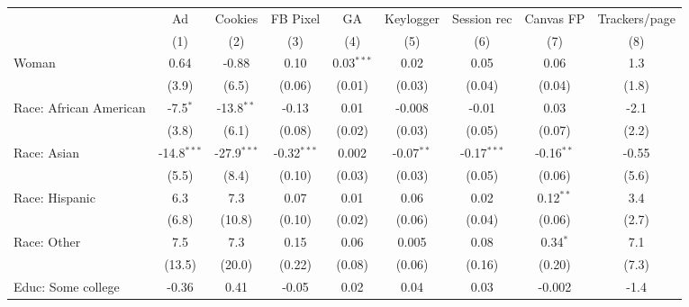 
\begingroup
\centering
\begin{adjustbox}{width = \textwidth, center}
   \begin{tabular}{lcccccccc}
      \toprule
                              & Ad            & Cookies       & FB Pixel      & GA           & Keylogger    & Session rec   & Canvas FP    & Trackers/page \\   
                              & (1)           & (2)           & (3)           & (4)          & (5)          & (6)           & (7)          & (8)\\  
      \midrule 
      Woman                   & 0.64          & -0.88         & 0.10          & 0.03$^{***}$ & 0.02         & 0.05          & 0.06         & 1.3\\   
                              & (3.9)         & (6.5)         & (0.06)        & (0.01)       & (0.03)       & (0.04)        & (0.04)       & (1.8)\\   
      Race: African American  & -7.5$^{*}$    & -13.8$^{**}$  & -0.13         & 0.01         & -0.008       & -0.01         & 0.03         & -2.1\\   
                              & (3.8)         & (6.1)         & (0.08)        & (0.02)       & (0.03)       & (0.05)        & (0.07)       & (2.2)\\   
      Race: Asian             & -14.8$^{***}$ & -27.9$^{***}$ & -0.32$^{***}$ & 0.002        & -0.07$^{**}$ & -0.17$^{***}$ & -0.16$^{**}$ & -0.55\\   
                              & (5.5)         & (8.4)         & (0.10)        & (0.03)       & (0.03)       & (0.05)        & (0.06)       & (5.6)\\   
      Race: Hispanic          & 6.3           & 7.3           & 0.07          & 0.01         & 0.06         & 0.02          & 0.12$^{**}$  & 3.4\\   
                              & (6.8)         & (10.8)        & (0.10)        & (0.02)       & (0.06)       & (0.04)        & (0.06)       & (2.7)\\   
      Race: Other             & 7.5           & 7.3           & 0.15          & 0.06         & 0.005        & 0.08          & 0.34$^{*}$   & 7.1\\   
                              & (13.5)        & (20.0)        & (0.22)        & (0.08)       & (0.06)       & (0.16)        & (0.20)       & (7.3)\\   
      Educ: Some college      & -0.36         & 0.41          & -0.05         & 0.02         & 0.04         & 0.03          & -0.002       & -1.4\\   

\end{tabular}
\end{adjustbox}
